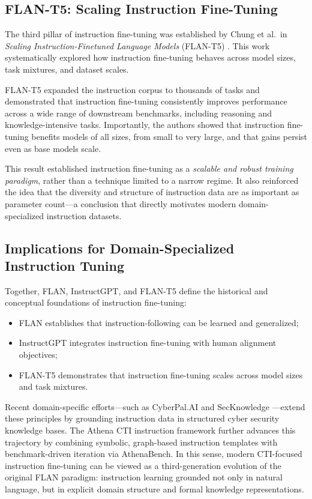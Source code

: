 \documentclass[unnumsec,webpdf,contemporary,large]{oup-authoring-template}
\theoremstyle{thmstyleone}
\theoremstyle{thmstyletwo}
\theoremstyle{thmstylethree}
\begin{document}
\subsection{FLAN-T5: Scaling Instruction Fine-Tuning}

The third pillar of instruction fine-tuning was established by Chung et al.\ in \emph{Scaling Instruction-Finetuned Language Models} (FLAN-T5) \cite{chung2022flant5}. This work systematically explored how instruction fine-tuning behaves across model sizes, task mixtures, and dataset scales.

FLAN-T5 expanded the instruction corpus to thousands of tasks and demonstrated that instruction fine-tuning consistently improves performance across a wide range of downstream benchmarks, including reasoning and knowledge-intensive tasks. Importantly, the authors showed that instruction fine-tuning benefits models of all sizes, from small to very large, and that gains persist even as base models scale.

This result established instruction fine-tuning as a \emph{scalable and robust training paradigm}, rather than a technique limited to a narrow regime. It also reinforced the idea that the diversity and structure of instruction data are as important as parameter count---a conclusion that directly motivates modern domain-specialized instruction datasets.

\subsection{Implications for Domain-Specialized Instruction Tuning}

Together, FLAN, InstructGPT, and FLAN-T5 define the historical and conceptual foundations of instruction fine-tuning:
\begin{itemize}
  \item FLAN establishes that instruction-following can be learned and generalized;
  \item InstructGPT integrates instruction fine-tuning with human alignment objectives;
  \item FLAN-T5 demonstrates that instruction fine-tuning scales across model sizes and task mixtures.
\end{itemize}

Recent domain-specific efforts---such as CyberPal.AI and SecKnowledge \cite{levi2024cyberpal,levi2025toward}---extend these principles by grounding instruction data in structured cyber security knowledge bases. The Athena CTI instruction framework further advances this trajectory by combining symbolic, graph-based instruction templates with benchmark-driven iteration via AthenaBench. In this sense, modern CTI-focused instruction fine-tuning can be viewed as a third-generation evolution of the original FLAN paradigm: instruction learning grounded not only in natural language, but in explicit domain structure and formal knowledge representations.
\end{document}
